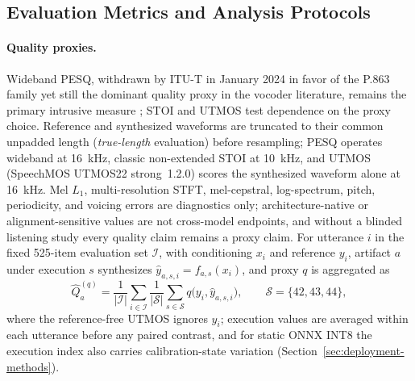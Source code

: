 \subsection{Evaluation Metrics and Analysis Protocols}
\label{sec:evaluation-protocols}

\paragraph{Quality proxies.}
Wideband PESQ, withdrawn by ITU-T in January 2024 in favor of the P.863
family \citep{itut2024p862} yet still the dominant quality proxy in
the vocoder literature, remains the primary intrusive measure
\citep{rix2001pesq};
STOI \citep{taal2011stoi} and UTMOS \citep{saeki2022utmos} test dependence on
the proxy choice.  Reference and synthesized waveforms are truncated to
their common unpadded length (\emph{true-length} evaluation) before
resampling; PESQ operates wideband at
16~kHz, classic non-extended STOI at 10~kHz, and UTMOS (SpeechMOS UTMOS22
strong~1.2.0) scores the synthesized waveform alone at 16~kHz.  Mel $L_1$, multi-resolution STFT, mel-cepstral,
log-spectrum, pitch, periodicity, and voicing errors are diagnostics only;
architecture-native or alignment-sensitive values are not cross-model
endpoints, and without a blinded listening study every quality claim remains
a proxy claim.  For utterance $i$ in the fixed 525-item evaluation set
$\mathcal I$, with conditioning $x_i$ and reference $y_i$, artifact $a$
under execution $s$ synthesizes $\widehat y_{a,s,i}=f_{a,s}(x_i)$, and
proxy $q$ is aggregated as
\begin{equation}
  \widehat Q_a^{(q)}
  =\frac{1}{|\mathcal I|}\sum_{i\in\mathcal I}
   \frac{1}{|\mathcal S|}\sum_{s\in\mathcal S}
   q\bigl(y_i,\widehat y_{a,s,i}\bigr),
  \qquad \mathcal S=\{42,43,44\},
  \label{eq:quality-estimator}
\end{equation}
where the reference-free UTMOS ignores $y_i$; execution values are averaged
within each utterance before any paired contrast, and for static ONNX INT8
the execution index also carries calibration-state variation
(Section~\ref{sec:deployment-methods}).

